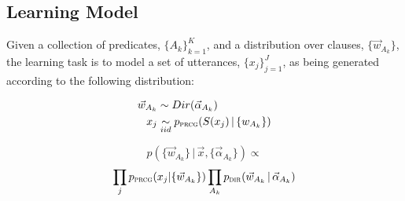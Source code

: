 \documentclass[11pt, twocolumn]{article}
\begin{document}




\subsection{Learning Model}

Given a collection of predicates, $\{A_k\}_{k=1}^{K}$, and a
distribution over clauses, $\{\vec{w}_{A_k}\}$, the learning task is
to model a set of utterances, $\{x_j\}_{j=1}^{J}$, as being generated
according to the following distribution:

\begin{align*}
  \vec{w}_{A_k} &\sim Dir(\vec{\alpha}_{A_k})\\
  x_j &\underset{iid}{\sim} p_{\text{\textsc{prcg}}}(S(x_j)\,|\,\{w_{A_k}\})
\end{align*}

\[ p(\{\vec{w}_{A_k}\}\,|\, \vec{x}, \{\vec{\alpha}_{A_k}\}) \propto\]\[ \prod_j
p_{\text{\textsc{prcg}}}(x_j|\{\vec{w}_{A_k}\}) \prod_{A_k} p_{\text{\textsc{dir}}}(\vec{w}_{A_k}\,|\,\vec{\alpha}_{A_k}) \]
\end{document}
